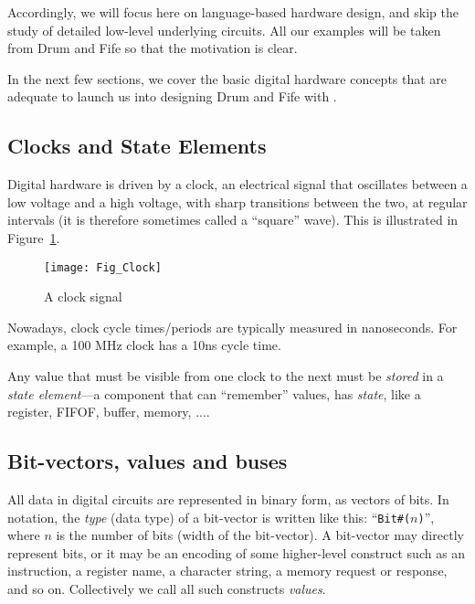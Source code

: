 Accordingly, we will focus here on {\BSV} language-based hardware design,
and skip the study of detailed low-level underlying circuits.  All our
examples will be taken from Drum and Fife so that the motivation is
clear.

In the next few sections, we cover the basic digital hardware concepts
that are adequate to launch us into designing Drum and Fife with {\BSV}.


\subsection{Clocks and State Elements}

Digital hardware is driven by a clock, an electrical signal that
oscillates between a low voltage and a high voltage, with sharp
transitions between the two, at regular intervals (it is therefore
sometimes called a ``square'' wave).  This is illustrated in
Figure~\ref{Fig_Clock_1}.

\begin{figure}[htbp]
  \centerline{\texttt{[image: Fig\_Clock]}}
  \caption{\label{Fig_Clock_1}A clock signal}
\end{figure}

Nowadays, clock cycle times/periods are typically measured in
nanoseconds. For example, a 100 MHz clock has a 10ns cycle time.


Any value that must be visible from one clock to the next must be
\emph{stored} in a \emph{state element}---a component that can
``remember'' values, {\ie} has \emph{state}, like a register, FIFOF,
buffer, memory, ....


\subsection{Bit-vectors, values and buses}


All data in digital circuits are represented in binary form, as
vectors of bits.  In {\BSV} notation, the \emph{type} (data type) of a
bit-vector is written like this: ``{\tt Bit\#($n$)}'', where $n$ is
the number of bits (width of the bit-vector).  A bit-vector may
directly represent bits, or it may be an encoding of some higher-level
construct such as an instruction, a register name, a character string,
a memory request or response, and so on.  Collectively we call all
such constructs \emph{values}.

